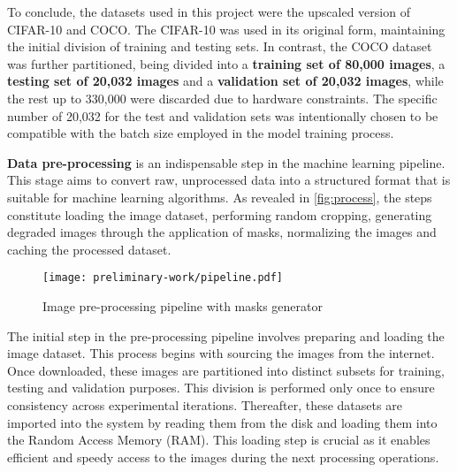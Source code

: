 To conclude, the datasets used in this project were the upscaled version of CIFAR-10 and COCO. The CIFAR-10 was used in its original form, maintaining the initial division of training and testing sets. In contrast, the COCO dataset was further partitioned, being divided into a \textbf{training set of 80,000 images}, a \textbf{testing set of 20,032 images} and a \textbf{validation set of 20,032 images}, while the rest up to 330,000 were discarded due to hardware constraints. The specific number of 20,032 for the test and validation sets was intentionally chosen to be compatible with the batch size employed in the model training process.

\label{section:preprocess}

\textbf{Data pre-processing} is an indispensable step in the machine learning pipeline. This stage aims to convert raw, unprocessed data into a structured format that is suitable for machine learning algorithms. As revealed in \autoref{fig:process}, the steps constitute loading the image dataset, performing random cropping, generating degraded images through the application of masks, normalizing the images and caching the processed dataset.
\begin{figure}[ht]
    \centering
    \texttt{[image: preliminary-work/pipeline.pdf]}
    \caption{Image pre-processing pipeline with masks generator}
    \label{fig:process}
\end{figure}


The initial step in the pre-processing pipeline involves preparing and loading the image dataset. This process begins with sourcing the images from the internet. Once downloaded, these images are partitioned into distinct subsets for training, testing and validation purposes. This division is performed only once to ensure consistency across experimental iterations. Thereafter, these datasets are imported into the system by reading them from the disk and loading them into the Random Access Memory (RAM). This loading step is crucial as it enables efficient and speedy access to the images during the next processing operations.


